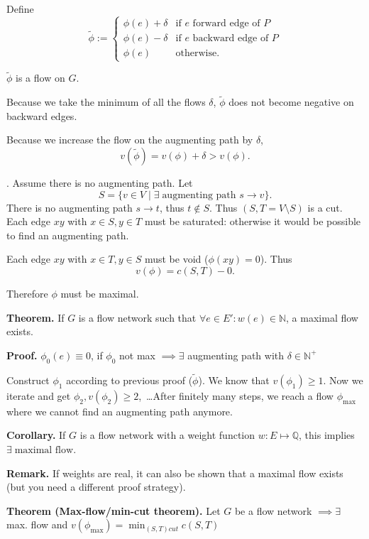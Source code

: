 Define
\[
    \tilde\phi := \begin{cases}
        \phi(e) + \delta &\text{if $e$ forward edge of $P$} \\
        \phi(e) - \delta &\text{if $e$ backward edge of $P$} \\
        \phi(e) &\text{otherwise}.
    \end{cases}
\]

$\tilde\phi$ is a flow on $G$.

Because we take the minimum of all the flows $\delta$, $\tilde\phi$ does not become negative on backward edges.

Because we increase the flow on the augmenting path by $\delta$,
\[
    v(\tilde\phi) = v(\phi) + \delta > v(\phi).
\]

\ProofBackward.
Assume there is no augmenting path. Let
\[
    S = \{v\in V \mid \exists\;\text{augmenting path $s\rightarrow v$}\}.
\]
There is no augmenting path $s\rightarrow t$, thus $t \notin S$.
Thus $(S, T = V\setminus S)$ is a cut.
Each edge $xy$ with $x\in S, y\in T$ must be saturated: otherwise it would be possible to find an augmenting path.


Each edge $xy$ with $x\in T, y\in S$ must be void ($\phi(xy) = 0$). Thus
\[
    v(\phi) = c(S,T) - 0.
\]

Therefore $\phi$ must be maximal.

\textbf{Theorem.} If $G$ is a flow network such that $\forall e\in E': w(e)\in
\mathbb{N}$, a maximal flow exists.

\textbf{Proof.} $ \phi_{0}(e) \equiv 0$, if $\phi_{0}$ not max $\implies \exists$ augmenting path with $\delta \in \mathbb{N^{+}}$

Construct $\phi_1$ according to previous proof ($\tilde\phi$). We know that $v(\phi_1) ≥ 1$. Now we iterate and get $\phi_2, v(\phi_2) ≥ 2$,~\ldots After finitely many steps, we reach a flow $\phi_{\text{max}}$ where we cannot find an augmenting path anymore.

\textbf{Corollary.} If $G$ is a flow network with a weight function $w: E\mapsto \mathbb{Q}$, this implies $\exists\;\text{maximal flow}$.

\textbf{Remark.}
If weights are real, it can also be shown that a maximal flow exists (but you need a different proof strategy).

\textbf{Theorem (Max-flow/min-cut theorem).}
Let $G$ be a flow network $\implies \exists$ max. flow and $v(\phi_{\text{max}})= \min_{(S,T) cut} c(S,T)$

